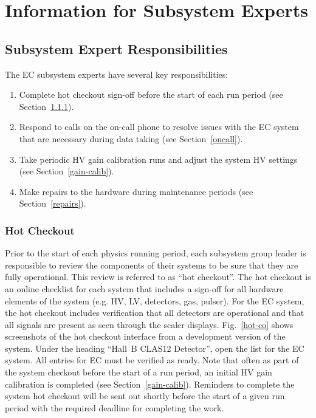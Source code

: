 \documentclass[letterpaper,10pt]{article}
\begin{document}
\clearpage

\vfil
\eject

\section{Information for Subsystem Experts}

\subsection{Subsystem Expert Responsibilities}

The EC subsystem experts have several key responsibilities:

\begin{enumerate}
\item Complete hot checkout sign-off before the start of each run period (see Section~\ref{checkout}).
\item Respond to calls on the on-call phone to resolve issues with the EC system that are necessary during
data taking (see Section~\ref{oncall}).
\item Take periodic HV gain calibration runs and adjust the system HV settings (see 
Section~\ref{gain-calib}).
\item Make repairs to the hardware during maintenance periods (see Section~\ref{repairs}).
\end{enumerate}

\subsubsection{Hot Checkout}
\label{checkout}

Prior to the start of each physics running period, each subsystem group leader is responsible to
review the components of their systems to be sure that they are fully operational. This review is
referred to as ``hot checkout''. The hot checkout is an online checklist for each system that
includes a sign-off for all hardware elements of the system (e.g. HV, LV, detectors, gas, pulser).
For the EC system, the hot checkout includes verification that all detectors are operational and
that all signals are present as seen through the scaler displays. Fig.~\ref{hot-co} shows screenshots 
of the hot checkout interface from a development version of the system. Under the heading ``Hall~B
CLAS12 Detector'', open the list for the EC system. All entries for EC must be verified as ready.
Note that often as part of the system checkout before the start of a run period, an initial HV gain 
calibration is completed (see Section~\ref{gain-calib}). Reminders to complete the system hot checkout
will be sent out shortly before the start of a given run period with the required deadline for
completing the work.
\end{document}
